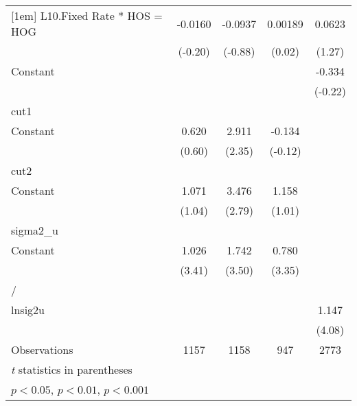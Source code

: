 {\begin{longtable}{l*{4}{c}}
[1em]
L10.Fixed Rate * HOS = HOG&  -0.0160         &  -0.0937         &  0.00189         &   0.0623         \\
                &  (-0.20)         &  (-0.88)         &   (0.02)         &   (1.27)         \\
[1em]
Constant        &                  &                  &                  &   -0.334         \\
                &                  &                  &                  &  (-0.22)         \\
\hline
cut1            &                  &                  &                  &                  \\
Constant        &    0.620         &    2.911\sym{*}  &   -0.134         &                  \\
                &   (0.60)         &   (2.35)         &  (-0.12)         &                  \\
\hline
cut2            &                  &                  &                  &                  \\
Constant        &    1.071         &    3.476\sym{**} &    1.158         &                  \\
                &   (1.04)         &   (2.79)         &   (1.01)         &                  \\
\hline
sigma2\_u        &                  &                  &                  &                  \\
Constant        &    1.026\sym{***}&    1.742\sym{***}&    0.780\sym{***}&                  \\
                &   (3.41)         &   (3.50)         &   (3.35)         &                  \\
\hline
/               &                  &                  &                  &                  \\
lnsig2u         &                  &                  &                  &    1.147\sym{***}\\
                &                  &                  &                  &   (4.08)         \\
\hline
Observations    &     1157         &     1158         &      947         &     2773         \\
\hline\hline
\multicolumn{5}{l}{\footnotesize \textit{t} statistics in parentheses}\\
\multicolumn{5}{l}{\footnotesize \sym{*} \(p<0.05\), \sym{**} \(p<0.01\), \sym{***} \(p<0.001\)}\\
\end{longtable}
}
